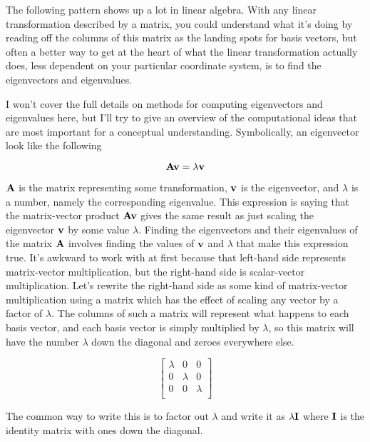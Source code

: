 The following pattern shows up a lot in linear algebra. With any linear
transformation described by a matrix, you could understand what it's doing by
reading off the columns of this matrix as the landing spots for basis vectors,
but often a better way to get at the heart of what the linear transformation
actually does, less dependent on your particular coordinate system, is to find
the eigenvectors and eigenvalues.

I won't cover the full details on methods for computing eigenvectors and
eigenvalues here, but I'll try to give an overview of the computational ideas
that are most important for a conceptual understanding. Symbolically, an
eigenvector look like the following

\begin{equation*}
  \mathbf{A}\mathbf{v} = \lambda \mathbf{v}
\end{equation*}

$\mathbf{A}$ is the matrix representing some transformation, $\mathbf{v}$ is the
eigenvector, and $\lambda$ is a number, namely the corresponding eigenvalue.
This expression is saying that the matrix-vector product $\mathbf{A}\mathbf{v}$ gives
the same result as just scaling the eigenvector $\mathbf{v}$ by some value
$\lambda$. Finding the eigenvectors and their eigenvalues of the matrix
$\mathbf{A}$ involves finding the values of $\mathbf{v}$ and $\lambda$ that make this
expression true. It's awkward to work with at first because that left-hand side
represents matrix-vector multiplication, but the right-hand side is
scalar-vector multiplication. Let's rewrite the right-hand side as some kind of
matrix-vector multiplication using a matrix which has the effect of scaling any
vector by a factor of $\lambda$. The columns of such a matrix will represent
what happens to each basis vector, and each basis vector is simply multiplied by
$\lambda$, so this matrix will have the number $\lambda$ down the diagonal and
zeroes everywhere else.

\begin{equation*}
  \begin{bmatrix}
    \lambda & 0 & 0 \\
    0 & \lambda & 0 \\
    0 & 0 & \lambda \\
  \end{bmatrix}
\end{equation*}

The common way to write this is to factor out $\lambda$ and write it as
$\lambda\mathbf{I}$ where $\mathbf{I}$ is the identity matrix with ones down the
diagonal.

